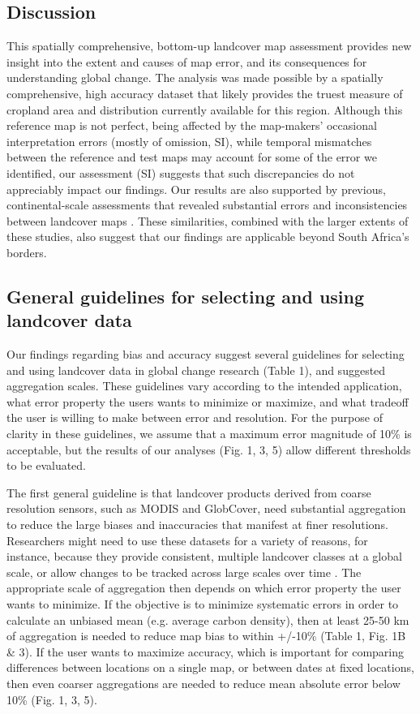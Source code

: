 \documentclass{pnastwo}
\begin{document}
\begin{article}
\section{Discussion}
This spatially comprehensive, bottom-up landcover map assessment provides new insight into the extent and causes of map error, and its consequences for understanding global change. The analysis was made possible by a spatially comprehensive, high accuracy dataset that likely provides the truest measure of cropland area and distribution currently available for this region. Although this reference map is not perfect, being affected by the map-makers' occasional interpretation errors (mostly of omission, SI), while temporal mismatches between the reference and test maps may account for some of the error we identified, our assessment (SI) suggests that such discrepancies do not appreciably impact our findings. Our results are also supported by previous, continental-scale assessments that revealed substantial errors and inconsistencies between landcover maps \cite{fritz_comparison_2010,gross_monitoring_2013}. These similarities, combined with the larger extents of these studies, also suggest that our findings are applicable beyond South Africa's borders.

\subsection{General guidelines for selecting and using landcover data}
Our findings regarding bias and accuracy suggest several guidelines for selecting and using landcover data in global change research (Table 1), and suggested aggregation scales. These guidelines vary according to the intended application, what error property the users wants to minimize or maximize, and what tradeoff the user is willing to make between error and resolution.  For the purpose of clarity in these guidelines, we assume that a maximum error magnitude of 10\% is acceptable, but the results of our analyses (Fig. 1, 3, 5) allow different thresholds to be  evaluated.  

The first general guideline is that landcover products derived from coarse resolution sensors, such as MODIS and GlobCover, need substantial aggregation to reduce the large biases and inaccuracies that manifest at finer resolutions. Researchers might need to use these datasets for a variety of reasons, for instance, because they provide consistent, multiple landcover classes at a global scale, or allow changes to be tracked across large scales over time \cite{luoto_predicting_2004}. The appropriate scale of aggregation then depends on which error property the user wants to minimize. If the objective is to minimize systematic errors in order to calculate an unbiased mean (e.g. average carbon density), then at least 25-50 km of aggregation is needed to reduce map bias to within +/-10\% (Table 1, Fig. 1B \& 3). If the user wants to maximize accuracy, which is important for comparing differences between locations on a single map, or between dates at fixed locations, then even coarser aggregations are needed to reduce mean absolute error below 10\% (Fig. 1, 3, 5).  


\end{article}
\end{document}
